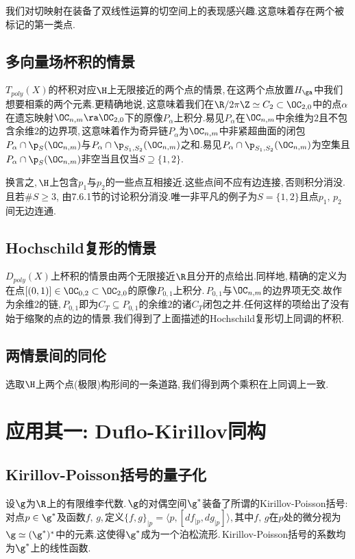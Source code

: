我们对切映射在装备了双线性运算的切空间上的表现感兴趣.这意味着存在两个被标记的第一类点.


\subsection{多向量场杯积的情景}

$T_{poly}(X)$的杯积对应$\H$上无限接近的两个点的情景,\,在这两个点放置$H_{\ga}$中我们想要相乘的两个元素.更精确地说,\,这意味着我们在$\R/2\pi \Z \simeq C_2\subset \OC_{2,0}$中的点$\alpha$在遗忘映射$\OC_{n,m}\ra\OC_{2,0}$下的原像$P_{\alpha}$上积分.易见$P_{\alpha}$在$\OC_{n,m}$中余维为$2$且不包含余维$2$的边界项,\,这意味着作为奇异链$P_{\alpha}$为$\OC_{n,m}$中非紧超曲面的闭包
$P_{\alpha}\cap \p_S(\OC_{n,m})$与$P_{\alpha}\cap \p_{S_1,S_2}(\OC_{n,m})$之和.易见$P_{\alpha}\cap \p_{S_1,S_2}(\OC_{n,m})$为空集且$P_{\alpha}\cap \p_S(\OC_{n,m})$非空当且仅当$S\supseteq \{1,2\}$.

换言之,\,$\H$上包含$p_1$与$p_2$的一些点互相接近.这些点间不应有边连接,\,否则积分消没.且若$\#S\ge 3$,\,\,由7.6.1节的讨论积分消没.唯一非平凡的例子为$S=\{1,2\}$且点$p_1,\,p_2$间无边连通.


\subsection{Hochschild复形的情景}

$D_{poly}(X)$上杯积的情景由两个无限接近$\R$且分开的点给出.同样地,\,精确的定义为在点$[(0,1)]\in \OC_{0,2}\subset \OC_{2,0}$的原像$P_{0,1}$上积分.\,$P_{0,1}$与$\OC_{n,m}$的边界项无交.故作为余维$2$的链,\,$P_{0,1}$即为$C_T\subseteq P_{0,1}$的余维$2$的诸$C_T$闭包之并.任何这样的项给出了没有始于缩聚的点的边的情景.我们得到了上面描述的Hochschild复形切上同调的杯积.

\subsection{两情景间的同伦}

选取$\H$上两个点(极限)构形间的一条道路,\,我们得到两个乘积在上同调上一致.


\section{应用其一:\,\,Duflo-Kirillov同构}

\subsection{Kirillov-Poisson括号的量子化}
设$\g$为$\R$上的有限维李代数.\,$\g$的对偶空间$\g^*$装备了所谓的Kirillov-Poisson括号:\,对点$p\in \g^*$及函数$f,\,g$,\,定义$\{f,g\}_{|p}=\langle p,[df_{|p},dg_{|p}]\rangle$,\,其中$f,\,g$在$p$处的微分视为$\g\simeq (\g^*)^*$中的元素.这使得$\g^*$成为一个泊松流形.\,Kirillov-Poisson括号的系数均为$\g^*$上的线性函数.

